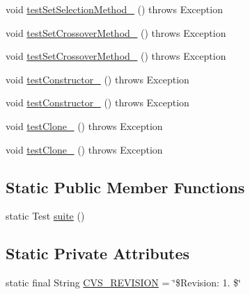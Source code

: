 \begin{DoxyCompactItemize}
\item 
void \hyperlink{classorg_1_1jgap_1_1gp_1_1impl_1_1_g_p_configuration_test_af8663cd5a34e7886bc115ea92e6c8a1f}{test\-Set\-Selection\-Method\-\_} ()  throws Exception 
\item 
void \hyperlink{classorg_1_1jgap_1_1gp_1_1impl_1_1_g_p_configuration_test_a06d18195fb0b39b0b8694740db0ce8e5}{test\-Set\-Crossover\-Method\-\_} ()  throws Exception 
\item 
void \hyperlink{classorg_1_1jgap_1_1gp_1_1impl_1_1_g_p_configuration_test_a7601be51fb7aefcebc04c9884cce9000}{test\-Set\-Crossover\-Method\-\_} ()  throws Exception 
\item 
void \hyperlink{classorg_1_1jgap_1_1gp_1_1impl_1_1_g_p_configuration_test_a383c72b4b282f0a9a5bc4b3dfb824ba4}{test\-Constructor\-\_} ()  throws Exception 
\item 
void \hyperlink{classorg_1_1jgap_1_1gp_1_1impl_1_1_g_p_configuration_test_aa2c5ff961816c30e365d6c246fb57b96}{test\-Constructor\-\_} ()  throws Exception 
\item 
void \hyperlink{classorg_1_1jgap_1_1gp_1_1impl_1_1_g_p_configuration_test_ae20393397c46c49a290ff7ece98e8b9a}{test\-Clone\-\_} ()  throws Exception 
\item 
void \hyperlink{classorg_1_1jgap_1_1gp_1_1impl_1_1_g_p_configuration_test_a60e0dfbea76ffe69d9adc8b20ab12dea}{test\-Clone\-\_} ()  throws Exception 
\end{DoxyCompactItemize}
\subsection*{Static Public Member Functions}
\begin{DoxyCompactItemize}
\item 
static Test \hyperlink{classorg_1_1jgap_1_1gp_1_1impl_1_1_g_p_configuration_test_a1be4f79e6753fb6f5f4a2c7c2c37a4ed}{suite} ()
\end{DoxyCompactItemize}
\subsection*{Static Private Attributes}
\begin{DoxyCompactItemize}
\item 
static final String \hyperlink{classorg_1_1jgap_1_1gp_1_1impl_1_1_g_p_configuration_test_ab1dd3b005cb271b8795efcfe58336d39}{C\-V\-S\-\_\-\-R\-E\-V\-I\-S\-I\-O\-N} = \char`\"{}\$Revision\-: 1. \$\char`\"{}
\end{DoxyCompactItemize}
